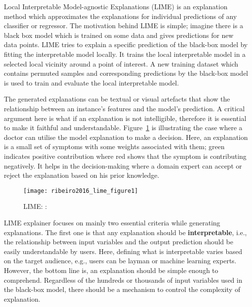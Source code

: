 \documentclass[english]{tktltiki2}
\theoremstyle{definition}
\theoremstyle{remark}
\begin{document}
Local Interpretable Model-agnostic Explanations (LIME) \citep{ribeiro2016should} is an explanation method which approximates the explanations for individual predictions of any classifier or regressor. The motivation behind LIME is simple; imagine there is a black box model which is trained on some data and gives predictions for new data points. LIME tries to explain a specific prediction of the black-box model by fitting the interpretable model locally. It trains the local interpretable model in a selected local vicinity around a point of interest. A new training dataset which contains permuted samples and corresponding predictions by the black-box model is used to train and evaluate the local interpretable model. 

The generated explanations can be textual or visual artefacts that show the relationship between an instance's features and the model's prediction. A critical argument here is what if an explanation is not intelligible, therefore it is essential to make it faithful and understandable. Figure~\ref{fig:ribeiro2016_lime_figure1} is illustrating the case where a doctor can utilise the model explanation to make a decision. Here, an explanation is a small set of symptoms with some weights associated with them; green indicates positive contribution where red shows that the symptom is contributing negatively. It helps in the decision-making where a domain expert can accept or reject the explanation based on his prior knowledge.

\begin{figure}[H]
	\texttt{[image: ribeiro2016\_lime\_figure1]}
	\vspace*{-10mm}
	\caption{LIME: \citep{ribeiro2016should}: }
	\label{fig:ribeiro2016_lime_figure1}
\end{figure}



LIME \citep{ribeiro2016should} explainer focuses on mainly two essential criteria while generating explanations. The first one is that any explanation should be \textbf{interpretable}, i.e., the relationship between input variables and the output prediction should be easily understandable by users. Here, defining what is interpretable varies based on the target audience, e.g., users can be layman or machine learning experts. However, the bottom line is, an explanation should be simple enough to comprehend. Regardless of the hundreds or thousands of input variables used in the black-box model, there should be a mechanism to control the complexity of explanation.
\end{document}
